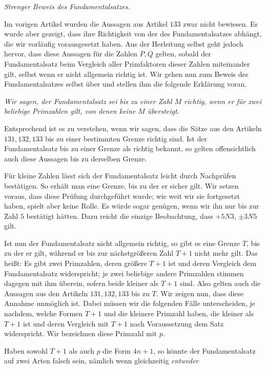\begin{center}\emph{Strenger Beweis des Fundamentalsatzes.}\end{center}

Im vorigen Artikel wurden die Aussagen aus Artikel $133$ zwar nicht bewiesen. Es wurde aber gezeigt, dass ihre Richtigkeit von der des Fundamentalsatzes abhängt, die wir vorläufig vorausgesetzt haben. Aus der Herleitung selbst geht jedoch hervor, dass diese Aussagen für die Zahlen $P,Q$ gelten, sobald der Fundamentalsatz beim Vergleich aller Primfaktoren dieser Zahlen miteinander gilt, selbst wenn er nicht allgemein richtig ist. Wir gehen nun zum Beweis des Fundamentalsatzes selbst über und stellen ihm die folgende Erklärung voran.

\emph{Wir sagen, der Fundamentalsatz sei bis zu einer Zahl $M$ richtig, wenn er für zwei beliebige Primzahlen gilt, von denen keine $M$ übersteigt.}

Entsprechend ist es zu verstehen, wenn wir sagen, dass die Sätze aus den Artikeln $131,132,133$ bis zu einer bestimmten Grenze richtig sind. Ist der Fundamentalsatz bis zu einer Grenze als richtig bekannt, so gelten offensichtlich auch diese Aussagen bis zu derselben Grenze.

Für kleine Zahlen lässt sich der Fundamentalsatz leicht durch Nachprüfen bestätigen. So erhält man eine Grenze, bis zu der er sicher gilt. Wir setzen voraus, dass diese Prüfung durchgeführt wurde; wie weit wir sie fortgesetzt haben, spielt aber keine Rolle. Es würde sogar genügen, wenn wir ihn nur bis zur Zahl $5$ bestätigt hätten. Dazu reicht die einzige Beobachtung, dass $+5N3$, $\pm3N5$ gilt.

Ist nun der Fundamentalsatz nicht allgemein richtig, so gibt es eine Grenze $T$, bis zu der er gilt, während er bis zur nächstgrößeren Zahl $T+1$ nicht mehr gilt. Das heißt: Es gibt zwei Primzahlen, deren größere $T+1$ ist und deren Vergleich dem Fundamentalsatz widerspricht; je zwei beliebige andere Primzahlen stimmen dagegen mit ihm überein, sofern beide kleiner als $T+1$ sind. Also gelten auch die Aussagen aus den Artikeln $131,132,133$ bis zu $T$. Wir zeigen nun, dass diese Annahme unmöglich ist. Dabei müssen wir die folgenden Fälle unterscheiden, je nachdem, welche Formen $T+1$ und die kleinere Primzahl haben, die kleiner als $T+1$ ist und deren Vergleich mit $T+1$ nach Voraussetzung dem Satz widerspricht. Wir bezeichnen diese Primzahl mit $p$.

Haben sowohl $T+1$ als auch $p$ die Form $4n+1$, so könnte der Fundamentalsatz auf zwei Arten falsch sein, nämlich wenn gleichzeitig \emph{entweder}

